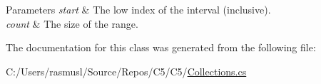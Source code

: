 \begin{DoxyParams}{Parameters}
{\em start} & The low index of the interval (inclusive).\\
\hline
{\em count} & The size of the range.\\
\hline
\end{DoxyParams}


The documentation for this class was generated from the following file\+:\begin{DoxyCompactItemize}
\item 
C\+:/\+Users/rasmusl/\+Source/\+Repos/\+C5/\+C5/\hyperlink{_collections_8cs}{Collections.\+cs}\end{DoxyCompactItemize}
